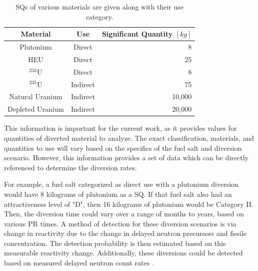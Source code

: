 \begin{table}[]
    \centering
    \caption{\Glspl{SQ} of various materials are given along with their use category.}
    \begin{tabular}{ccr}
        \hline
        Material & Use & Significant Quantity $[kg]$ \\
        \hline
        Plutonium & Direct & 8 \\
        \gls{HEU} & Direct & 25 \\
        $^{233}$U & Direct & 8 \\
        $^{235}$U & Indirect & 75 \\
        Natural Uranium & Indirect & 10,000 \\
        Depleted Uranium & Indirect & 20,000 \\
        \hline
    \end{tabular}
    \label{tab:sqs}
\end{table}




This information is important for the current work, as it provides values for quantities of diverted material to analyze.
The exact classification, materials, and quantities to use will vary based on the specifics of the fuel salt and diversion scenario.
However, this information provides a set of data which can be directly referenced to determine the diversion rates.

For example, a fuel salt categorized as direct use with a plutonium diversion would have 8 kilograms of plutonium as a \gls{SQ}.
If that fuel salt also had an attractiveness level of "D", then 16 kilograms of plutonium would be Category II.
Then, the diversion time could vary over a range of months to years, based on various \gls{PR} times.
A method of detection for these diversion scenarios is via change in reactivity due to the change in delayed neutron precursors and fissile concentration.
The detection probability is then estimated based on this measurable reactivity change.
Additionally, these diversions could be detected based on measured delayed neutron count rates \cite{sellers_candu_2012}.